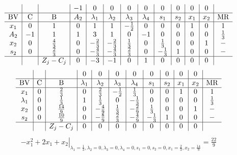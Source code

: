 \documentclass{article}
\begin{document}
\begin{align*}
\begin{array}{c|c|c|c|c|c|c|c|c|c|c|c|c}
 &  &  & -1 & 0 & 0 & 0 & 0 & 0 & 0 & 0 & 0 & \\
\hline
\text{BV} & \text{C} & \text{B} & A_{2} & \lambda_{1} & \lambda_{2} & \lambda_{3} & \lambda_{4} & s_{1} & s_{2} & x_{1} & x_{2} & \text{MR} \\
\hline
x_{1} & 0 & 1 & 0 & 1 & 1 & -\frac{1}{2} & 0 & 0 & 0 & 1 & 0 & 1 \\
A_{2} & -1 & 1 & 1 & 3 & 1 & 0 & -1 & 0 & 0 & 0 & 0 & \frac{1}{3} \\
x_{2} & 0 & \frac{4}{3} & 0 & -\frac{2}{3} & -\frac{2}{3} & \frac{1}{3} & 0 & \frac{1}{3} & 0 & 0 & 1 & - \\
s_{2} & 0 & \frac{2}{3} & 0 & -\frac{4}{3} & -\frac{4}{3} & \frac{2}{3} & 0 & -\frac{1}{3} & 1 & 0 & 0 & - \\
\hline
 &  & Z_j-C_j & 0 & -3 & -1 & 0 & 1 & 0 & 0 & 0 & 0 & \\
\end{array}
\end{align*}
\begin{align*}
\begin{array}{c|c|c|c|c|c|c|c|c|c|c|c}
 &  &  & 0 & 0 & 0 & 0 & 0 & 0 & 0 & 0 & \\
\hline
\text{BV} & \text{C} & \text{B} & \lambda_{1} & \lambda_{2} & \lambda_{3} & \lambda_{4} & s_{1} & s_{2} & x_{1} & x_{2} & \text{MR} \\
\hline
x_{1} & 0 & \frac{2}{3} & 0 & \frac{2}{3} & -\frac{1}{2} & \frac{1}{3} & 0 & 0 & 1 & 0 & 1 \\
\lambda_{1} & 0 & \frac{1}{3} & 1 & \frac{1}{3} & 0 & -\frac{1}{3} & 0 & 0 & 0 & 0 & \frac{1}{3} \\
x_{2} & 0 & \frac{14}{9} & 0 & -\frac{4}{9} & \frac{1}{3} & -\frac{2}{9} & \frac{1}{3} & 0 & 0 & 1 & - \\
s_{2} & 0 & \frac{10}{9} & 0 & -\frac{8}{9} & \frac{2}{3} & -\frac{4}{9} & -\frac{1}{3} & 1 & 0 & 0 & - \\
\hline
 &  & Z_j-C_j & 0 & 0 & 0 & 0 & 0 & 0 & 0 & 0 & \\
\end{array}
\end{align*}
\begin{align*}
\left.-x_{1}^{2} + 2x_{1} + x_{2}\right|_{\lambda_{1}=\frac{1}{3},\lambda_{2}=0,\lambda_{3}=0,\lambda_{4}=0,s_{1}=0,s_{2}=0,x_{1}=\frac{2}{3},x_{2}=\frac{14}{9}}=\frac{22}{9}\end{align*}
\end{document}
